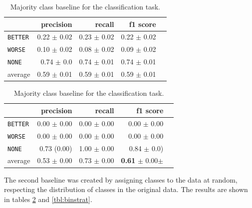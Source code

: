 \begin{table}[!htb]
    \begin{minipage}{.5\linewidth}
      \caption{Random (stratified) baseline for the classification task.}
      \label{tbl:3stratifiedbaseline}
      \centering
      
\begin{tabular}{@{}lrrrr@{}}
\toprule
 	&	 precision &	 recall &	 f1 score  \\ \midrule 
\texttt{BETTER}	&	 0.22 \scriptsize{$\pm$ 0.02} &	 0.23 \scriptsize{$\pm$ 0.02} &	 0.22 \scriptsize{$\pm$ 0.02}  \\ 
\texttt{WORSE}	&	 0.10 \scriptsize{$\pm$ 0.02} &	 0.08 \scriptsize{$\pm$ 0.02} &	 0.09 \scriptsize{$\pm$ 0.02}  \\ 
\texttt{NONE}	&	 0.74 \scriptsize{$\pm$ 0.0} &	 0.74 \scriptsize{$\pm$ 0.01} &	 0.74 \scriptsize{$\pm$ 0.01}  \\ 
average	&	 0.59 \scriptsize{$\pm$ 0.01} &	 0.59 \scriptsize{$\pm$ 0.01} &	 0.59 \scriptsize{$\pm$ 0.01}  \\ 
\bottomrule
\end{tabular} 

  \end{minipage}%
    \begin{minipage}{.5\linewidth}
      \centering
        \caption{Majority class baseline for the classification task.}
        \label{tbl:3majoritybaseline}
\begin{tabular}{@{}lrrrr@{}}
\toprule
 	&	 precision &	 recall &	 f1 score  \\ \midrule 
\texttt{BETTER}	&	 0.00 \scriptsize{$\pm$ 0.00} &	 0.00 \scriptsize{$\pm$ 0.00} &	 0.00 \scriptsize{$\pm$ 0.00}  \\ 
\texttt{WORSE}	&	 0.00 \scriptsize{$\pm$ 0.00} &	 0.00 \scriptsize{$\pm$ 0.00} &	 0.00 \scriptsize{$\pm$ 0.00}  \\ 
\texttt{NONE}	&	 0.73 \scriptsize{(0.00)} &	 1.00 \scriptsize{$\pm$ 0.00} &	 0.84 \scriptsize{$\pm$ 0.0)}  \\ 
average	&	 0.53 \scriptsize{$\pm$ 0.00} &	 0.73 \scriptsize{$\pm$ 0.00} &	 \textbf{0.61} \scriptsize{$\pm$ 0.00$\pm$ }  \\ 
\bottomrule
\end{tabular}
    \end{minipage} 
\end{table}



The second baseline was created by assigning classes to the data at random, respecting the distribution of classes in the original data. The results are shown in tables \ref{tbl:3majoritybaseline} and \ref{tbl:binstrat}.



